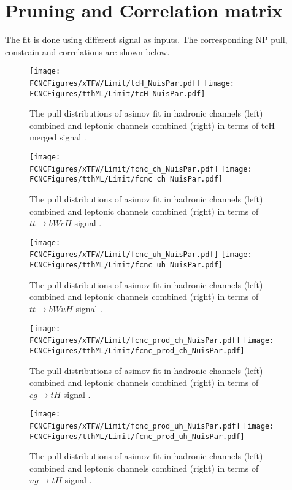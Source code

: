 \section{Pruning and Correlation matrix}

The fit is done using different signal as inputs. The corresponding NP pull, constrain and correlations are shown below.
\begin{figure}[H]
\centering
\texttt{[image: \\FCNCFigures/xTFW/Limit/tcH\_NuisPar.pdf]}
\texttt{[image: \\FCNCFigures/tthML/Limit/tcH\_NuisPar.pdf]}
\caption{ The pull distributions of asimov fit in hadronic channels (left) combined and leptonic channels combined (right) in terms of tcH merged signal . }
\label{fig:tcH_NuisPar}
\end{figure}

\begin{figure}[H]
\centering
\texttt{[image: \\FCNCFigures/xTFW/Limit/fcnc\_ch\_NuisPar.pdf]}
\texttt{[image: \\FCNCFigures/tthML/Limit/fcnc\_ch\_NuisPar.pdf]}
\caption{ The pull distributions of asimov fit in hadronic channels (left) combined and leptonic channels combined (right) in terms of $\bar{t}t\to bWcH$ signal . }
\label{fig:fcnc_ch_NuisPar}
\end{figure}

\begin{figure}[H]
\centering
\texttt{[image: \\FCNCFigures/xTFW/Limit/fcnc\_uh\_NuisPar.pdf]}
\texttt{[image: \\FCNCFigures/tthML/Limit/fcnc\_uh\_NuisPar.pdf]}
\caption{ The pull distributions of asimov fit in hadronic channels (left) combined and leptonic channels combined (right) in terms of $\bar{t}t\to bWuH$ signal . }
\label{fig:fcnc_uh_NuisPar}
\end{figure}

\begin{figure}[H]
\centering
\texttt{[image: \\FCNCFigures/xTFW/Limit/fcnc\_prod\_ch\_NuisPar.pdf]}
\texttt{[image: \\FCNCFigures/tthML/Limit/fcnc\_prod\_ch\_NuisPar.pdf]}
\caption{ The pull distributions of asimov fit in hadronic channels (left) combined and leptonic channels combined (right) in terms of $cg\to tH$ signal . }
\label{fig:fcnc_prod_ch_NuisPar}
\end{figure}

\begin{figure}[H]
\centering
\texttt{[image: \\FCNCFigures/xTFW/Limit/fcnc\_prod\_uh\_NuisPar.pdf]}
\texttt{[image: \\FCNCFigures/tthML/Limit/fcnc\_prod\_uh\_NuisPar.pdf]}
\caption{ The pull distributions of asimov fit in hadronic channels (left) combined and leptonic channels combined (right) in terms of $ug\to tH$ signal . }
\label{fig:fcnc_prod_uh_NuisPar}
\end{figure}


